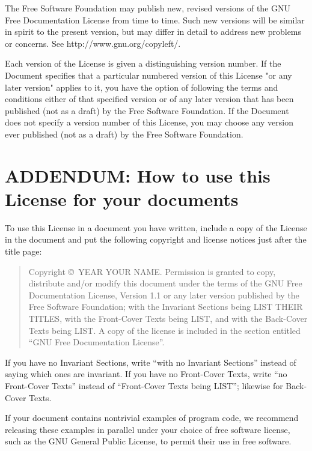 The Free Software Foundation may publish new, revised versions
of the GNU Free Documentation License from time to time.  Such new
versions will be similar in spirit to the present version, but may
differ in detail to address new problems or concerns. See
http://www.gnu.org/copyleft/.

Each version of the License is given a distinguishing version number.
If the Document specifies that a particular numbered version of this
License "or any later version" applies to it, you have the option of
following the terms and conditions either of that specified version or
of any later version that has been published (not as a draft) by the
Free Software Foundation.  If the Document does not specify a version
number of this License, you may choose any version ever published (not
as a draft) by the Free Software Foundation.

\section*{ADDENDUM: How to use this License for your documents}

To use this License in a document you have written, include a copy of
the License in the document and put the following copyright and
license notices just after the title page:

\begin{quote}

      Copyright \copyright\ YEAR  YOUR NAME.
      Permission is granted to copy, distribute and/or modify this document
      under the terms of the GNU Free Documentation License, Version 1.1
      or any later version published by the Free Software Foundation;
      with the Invariant Sections being LIST THEIR TITLES, with the
      Front-Cover Texts being LIST, and with the Back-Cover Texts being LIST.
      A copy of the license is included in the section entitled ``GNU
      Free Documentation License''.

\end{quote}

If you have no Invariant Sections, write ``with no Invariant Sections''
instead of saying which ones are invariant.  If you have no
Front-Cover Texts, write ``no Front-Cover Texts'' instead of
``Front-Cover Texts being LIST''; likewise for Back-Cover Texts.

If your document contains nontrivial examples of program code, we
recommend releasing these examples in parallel under your choice of
free software license, such as the GNU General Public License,
to permit their use in free software.

